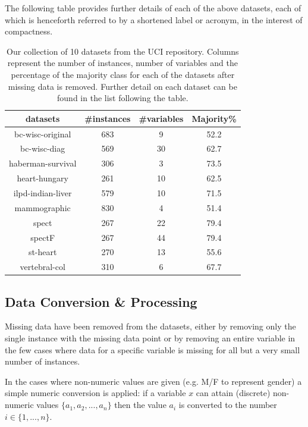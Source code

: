 \documentclass{document}
\begin{document}
The following table provides further details of each of the above datasets, each of which is henceforth referred to by a shortened label or acronym, in the interest of compactness.

\begin{table}[b]
\centering
\begin{tabular*}{8cm} {@{}c @{\extracolsep{\fill}} ccc@{}}
\hline
datasets        & \#instances  &\#variables & Majority\%\\
\hline
bc-wisc-original&       683    &   9        &   52.2\\ 
bc-wisc-diag    &       569    &   30       &   62.7\\ 
haberman-survival&      306    &   3        &   73.5\\
heart-hungary   &       261    &   10       &   62.5\\
ilpd-indian-liver&      579    &   10       &   71.5\\
mammographic    &       830    &   4        &   51.4\\
spect           &       267    &   22       &   79.4\\
spectF          &       267    &   44       &   79.4\\
st-heart        &       270    &   13       &   55.6\\
vertebral-col   &       310    &   6        &   67.7\\
\hline
\end{tabular*}
\caption{Our collection of 10 datasets from the UCI repository. Columns represent the number of instances, number of variables and the percentage of the majority class for each of the datasets after missing data is removed. Further detail on each dataset can be found in the list following the table.}
\label{table:datasets}
\end{table}

\subsection{Data Conversion \& Processing}

Missing data have been removed from the datasets, either by removing only the single instance with the missing data point or by removing an entire variable in the few cases where data for a specific variable is missing for all but a very small number of instances.

In the cases where non-numeric values are given (e.g. M/F to represent gender) a simple numeric conversion is applied: if a variable $x$ can attain (discrete) non-numeric values $\{a_{1}, a_{2}, ..., a_{n}\}$ then the value $a_{i}$ is converted to the number $i \in \{1,...,n\}$.
\end{document}
